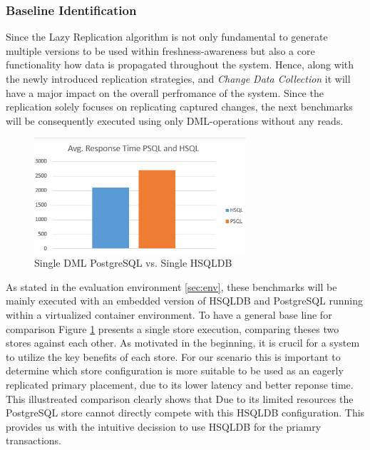 

\subsubsection{Baseline Identification} 


Since the Lazy Replication algorithm is not only fundamental to generate multiple versions to be used within freshness-awareness
but also a core functionality how data is propagated throughout the system. 
Hence, along with the newly introduced replication strategies, and \emph{Change Data Collection} it will have a major impact on the overall perfromance of the system.
Since the replication solely focuses on replicating captured changes, the next benchmarks will be consequently executed using only DML-operations without any reads.\\

\begin{figure}[t] 
    \centering 
    \includegraphics[width=0.7\textwidth]{Figures/hsql_psql.png}
    \caption{Single DML PostgreSQL vs. Single HSQLDB}
    \label{fig:singlepsqlhsql}
\end{figure}

As stated in the evaluation environment \ref{sec:env}, these benchmarks will be mainly executed with an embedded version of HSQLDB and PostgreSQL running within a virtualized 
container environment. To have a general base line for comparison Figure \ref{fig:singlepsqlhsql} presents a single store execution, comparing theses two stores against each other.
As motivated in the beginning, it is crucil for a system to utilize the key benefits of each store. For our scenario this is important to determine which 
store configuration is more suitable to be used as an eagerly replicated primary placement, due to its lower latency and better reponse time.\\
This illustreated comparison clearly shows that Due to its limited resources the PostgreSQL store cannot directly compete with this HSQLDB configuration.
This provides us with the intuitive decission to use HSQLDB for the priamry transactions.




